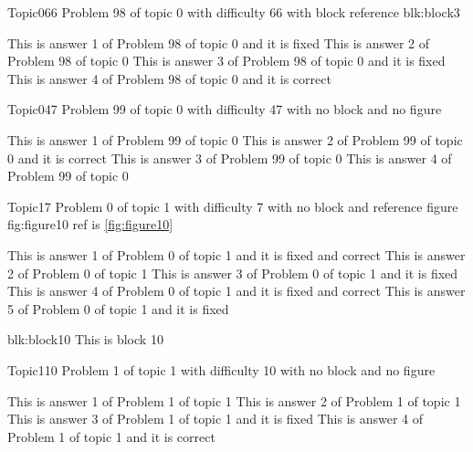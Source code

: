 \documentclass[master]{exam}
\begin{document}
\begin{problem}[requires=blk:block3]{Topic0}{66}
	Problem 98 of topic 0 with difficulty 66 with block reference blk:block3
	\begin{answers}
		\answer[fixed] This is answer 1 of Problem 98 of topic 0 and it is fixed
		\answer This is answer 2 of Problem 98 of topic 0 
		\answer[fixed] This is answer 3 of Problem 98 of topic 0 and it is fixed
		\answer[correct] This is answer 4 of Problem 98 of topic 0 and it is correct
	\end{answers}
\end{problem}

\begin{problem}{Topic0}{47}
	Problem 99 of topic 0 with difficulty 47 with no block and no figure
	\begin{answers}
		\answer This is answer 1 of Problem 99 of topic 0 
		\answer[correct] This is answer 2 of Problem 99 of topic 0 and it is correct
		\answer This is answer 3 of Problem 99 of topic 0 
		\answer This is answer 4 of Problem 99 of topic 0 
	\end{answers}
\end{problem}

\begin{problem}{Topic1}{7}
	Problem 0 of topic 1 with difficulty 7 with no block and reference figure fig:figure10 ref is \ref{fig:figure10}
	\begin{answers}
		 This is answer 1 of Problem 0 of topic 1 and it is fixed and correct
		\answer This is answer 2 of Problem 0 of topic 1 
		\answer[fixed] This is answer 3 of Problem 0 of topic 1 and it is fixed
		 This is answer 4 of Problem 0 of topic 1 and it is fixed and correct
		\answer[fixed] This is answer 5 of Problem 0 of topic 1 and it is fixed
	\end{answers}
\end{problem}



\begin{block}{blk:block10}
This is block 10
\end{block}


\begin{problem}{Topic1}{10}
	Problem 1 of topic 1 with difficulty 10 with no block and no figure
	\begin{answers}
		\answer This is answer 1 of Problem 1 of topic 1 
		\answer This is answer 2 of Problem 1 of topic 1 
		\answer[fixed] This is answer 3 of Problem 1 of topic 1 and it is fixed
		\answer[correct] This is answer 4 of Problem 1 of topic 1 and it is correct
	\end{answers}
\end{problem}
\end{document}
